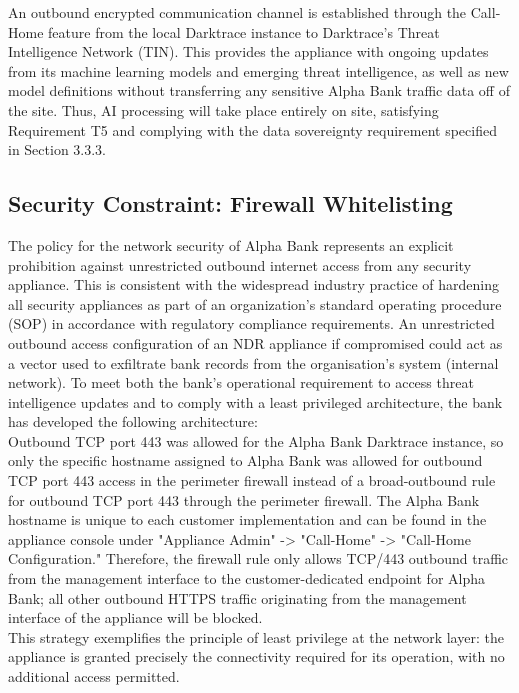 \documentclass[12pt,a4paper]{report}
\begin{document}
An outbound encrypted communication channel is established through the Call-Home feature from the local Darktrace instance to Darktrace's Threat Intelligence Network (TIN). This provides the appliance with ongoing updates from its machine learning models and emerging threat intelligence, as well as new model definitions without transferring any sensitive Alpha Bank traffic data off of the site. Thus, AI processing will take place entirely on site, satisfying Requirement T5 and complying with the data sovereignty requirement specified in Section 3.3.3.

\subsection{Security Constraint: Firewall Whitelisting}

The policy for the network security of Alpha Bank represents an explicit prohibition against unrestricted outbound internet access from any security appliance. This is consistent with the widespread industry practice of hardening all security appliances as part of an organization's standard operating procedure (SOP) in accordance with regulatory compliance requirements. An unrestricted outbound access configuration of an NDR appliance if compromised could act as a vector used to exfiltrate bank records from the organisation's system (internal network). To meet both the bank's operational requirement to access threat intelligence updates and to comply with a least privileged architecture, the bank has developed the following architecture:\\

Outbound TCP port 443 was allowed for the Alpha Bank Darktrace instance, so only the specific hostname assigned to Alpha Bank was allowed for outbound TCP port 443 access in the perimeter firewall instead of a broad-outbound rule for outbound TCP port 443 through the perimeter firewall. The Alpha Bank hostname is unique to each customer implementation and can be found in the appliance console under "Appliance Admin" -> "Call-Home" -> "Call-Home Configuration." Therefore, the firewall rule only allows TCP/443 outbound traffic from the management interface to the customer-dedicated endpoint for Alpha Bank; all other outbound HTTPS traffic originating from the management interface of the appliance will be blocked.\\

This strategy exemplifies the principle of least privilege at the network layer: the appliance is granted precisely the connectivity required for its operation, with no additional access permitted.
\end{document}
